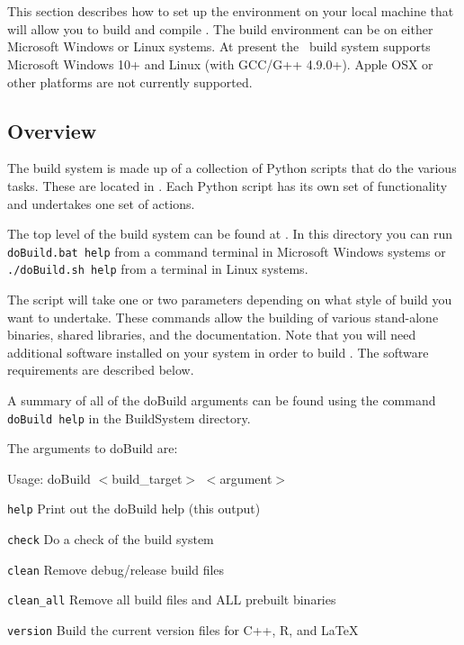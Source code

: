 \section{}\label{sec:build_environment}

This section describes how to set up the environment on your local machine that will allow you to build and compile \CNAME. The build environment can be on either Microsoft Windows or Linux systems. At present the \CNAME\ build system supports Microsoft Windows 10+ and Linux (with GCC/G++ 4.9.0+). Apple OSX or other platforms are not currently supported.

\subsection{Overview}

The build system is made up of a collection of Python scripts that do the various tasks. These are located in . Each Python script has its own set of functionality and undertakes one set of actions.

The top level of the build system can be found at . In this directory you can run \texttt{doBuild.bat help} from a command terminal in Microsoft Windows systems or \texttt{./doBuild.sh help} from a terminal in Linux systems.

The script will take one or two parameters depending on what style of build you want to undertake. These commands allow the building of various stand-alone binaries, shared libraries, and the documentation. Note that you will need additional software installed on your system in order to build \CNAME.  The software requirements are described below.

A summary of all of the doBuild arguments can be found using the command \texttt{doBuild help} in the BuildSystem directory.

The arguments to doBuild are:

Usage: doBuild $<$build\_target$>$ $<$argument$>$
\begin{description}
  \item{\texttt{help}} Print out the doBuild help (this output)
  \item{\texttt{check}} Do a check of the build system
  \item{\texttt{clean}} Remove debug/release build files
  \item{\texttt{clean\_all}} Remove all build files and ALL prebuilt binaries
  \item{\texttt{version}} Build the current version files for C++, R, and LaTeX
\end{description}

